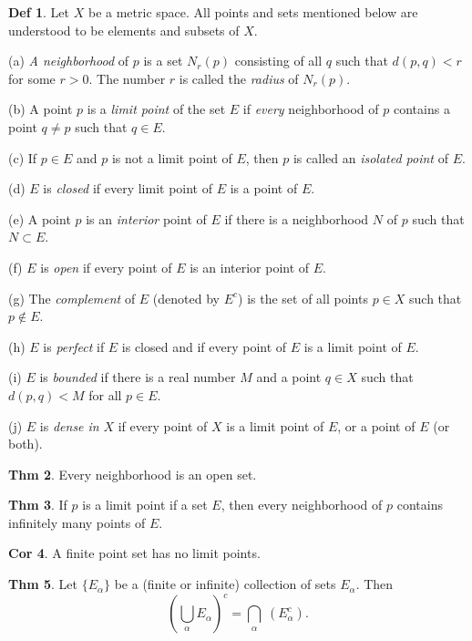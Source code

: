 \documentclass{article}
\theoremstyle{definition}
\newtheorem{definition}{Def}
\newtheorem{theorem}[definition]{Thm}
\newtheorem{corollary}[definition]{Cor}
\begin{document}
\begin{definition}
    Let $X$ be a metric space. All points and sets mentioned below are understood to be elements and subsets of $X$.\par
    (a) \textit{A neighborhood} of $p$ is a set $N_r(p)$ consisting of all $q$ such that $d(p, q)<r$ for some $r>0$. The number $r$ is called the \textit{radius} of $N_r(p)$.\par
    (b) A point $p$ is a \textit{limit point} of the set $E$ if \textit{every} neighborhood of $p$ contains a point $q\neq p$ such that $q\in E$.\par
    (c) If $p\in E$ and $p$ is not a limit point of $E$, then $p$ is called an \textit{isolated point} of $E$.\par
    (d) $E$ is \textit{closed} if every limit point of $E$ is a point of $E$.\par
    (e) A point $p$ is an \textit{interior} point of $E$ if there is a neighborhood $N$ of $p$ such that $N\subset E$.\par
    (f) $E$ is \textit{open} if every point of $E$ is an interior point of $E$.\par
    (g) The \textit{complement} of $E$ (denoted by $E^c$) is the set of all points $p\in X$ such that $p\notin E$.\par
    (h) $E$ is \textit{perfect} if $E$ is closed and if every point of $E$ is a limit point of $E$.\par
    (i) $E$ is \textit{bounded} if there is a real number $M$ and a point $q\in X$ such that $d(p, q)<M$ for all $p\in E$.\par
    (j) $E$ is \textit{dense in} $X$ if every point of $X$ is a limit point of $E$, or a point of $E$ (or both). 
\end{definition}
\begin{theorem}
    Every neighborhood is an open set.
\end{theorem}
\begin{theorem}
    If $p$ is a limit point if a set $E$, then every neighborhood of $p$ contains infinitely many points of $E$.
\end{theorem}
\begin{corollary}
    A finite point set has no limit points.
\end{corollary}
\begin{theorem}
    Let $\{E_\alpha\}$ be a (finite or infinite) collection of sets $E_\alpha$. Then
    \[
    (\bigcup_\alpha E_\alpha)^c=\bigcap_\alpha \;(E_\alpha^c).
    \]
\end{theorem}
\end{document}
